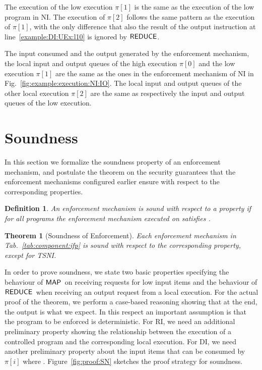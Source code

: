 \documentclass[10pt,a4paper,oneside]{article}
\newtheorem{definition}{Definition}[section]
\newtheorem{theorem}{Theorem}[section]
\def\sanserif#1{\ensuremath{\sf #1}}
\def\REDUCE{\ensuremath{\sanserif{REDUCE}}}
\def\MAP{\ensuremath{\sanserif{MAP}}}
\def\Prog{\ensuremath{\pi}}
\def\Progl#1{\ensuremath{\Prog[#1]}}
\begin{document}
The execution of the low execution \Progl{1} is the same as the execution of the low program in NI. The execution of \Progl{2} follows the same pattern as the execution of \Progl{1}, with the only difference that also the result of the output instruction at line~\ref{example:DI:UEx:l10} is ignored by \REDUCE.

The input consumed and the output generated by the enforcement mechanism, the local input and output queues of the high execution \Progl{0} and the low execution \Progl{1} are the same as the ones in the enforcement mechanism of NI in Fig.~\ref{fig:example:execution:NI:IO}. The local input and output queues of the other local execution \Progl{2} are the same as respectively the input and output queues of the low execution.






\section{Soundness} \label{sec:soundness}
In this section we formalize the soundness property of an enforcement mechanism, and postulate the theorem on the security guarantees that the enforcement mechanisms configured earlier ensure with respect to the corresponding properties.

\begin{definition}\label{def:soundness}
An enforcement mechanism is \emph{sound} with respect to a property  if for all programs  the enforcement mechanism executed on  satisfies .\end{definition}

\begin{theorem}[Soundness of Enforcement] \label{thm:soundess}
	Each enforcement mechanism in Tab.~\ref{tab:component:ifp} is sound with respect to the corresponding property, except for TSNI.
\end{theorem}
In order to prove soundness, we state two basic properties specifying the behaviour of \MAP\ on receiving requests for low input items and the behaviour of \REDUCE\ when receiving an output request from a local execution. For the actual proof of the theorem, we perform a case-based reasoning showing that at the end, the output is what we expect. In this respect an important assumption is that the program to be enforced is deterministic.  For RI, we need an additional preliminary property showing the relationship between the execution of a controlled program and the corresponding local execution. For DI, we need another preliminary property about the input items that can be consumed by \Progl{i} where . Figure~\ref{fig:proof:SN} sketches the proof strategy for soundness.
\end{document}
